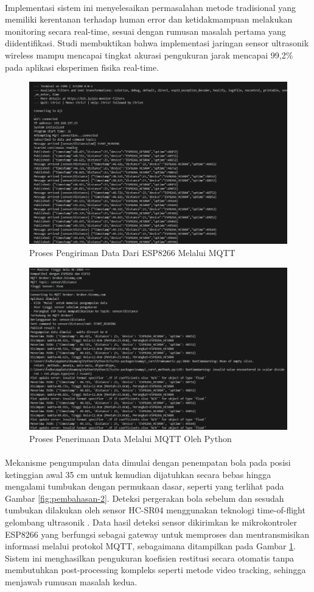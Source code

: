 \paragraph{}Implementasi sistem ini menyelesaikan permasalahan metode tradisional yang memiliki kerentanan terhadap human error dan ketidakmampuan melakukan monitoring secara real-time, sesuai dengan rumusan masalah pertama yang diidentifikasi. Studi \citep{wireless2019ultrasonic} membuktikan bahwa implementasi jaringan sensor ultrasonik wireless mampu mencapai tingkat akurasi pengukuran jarak mencapai 99,2\% pada aplikasi eksperimen fisika real-time.

\begin{figure}[!htbp]
\centering
    \includegraphics[width=0.6\linewidth]{images/ESP8266-SerialMonitor-MQTT.png}
    \caption{Proses Pengiriman Data Dari ESP8266 Melalui MQTT}
    \label{fig:pembahasan-3}
\end{figure}

\begin{figure}[!htbp]
\centering
    \includegraphics[width=0.6\linewidth]{images/Python-MQTT.png}
    \caption{Proses Penerimaan Data Melalui MQTT Oleh Python}
    \label{fig:pembahasan-4}
\end{figure}

\paragraph{}Mekanisme pengumpulan data dimulai dengan penempatan bola pada posisi ketinggian awal 35 cm untuk kemudian dijatuhkan secara bebas hingga mengalami tumbukan dengan permukaan dasar, seperti yang terlihat pada Gambar \ref{fig:pembahasan-2}. Deteksi pergerakan bola sebelum dan sesudah tumbukan dilakukan oleh sensor HC-SR04 menggunakan teknologi time-of-flight gelombang ultrasonik \citep{johnson2019time}. Data hasil deteksi sensor dikirimkan ke mikrokontroler ESP8266 yang berfungsi sebagai gateway untuk memproses dan mentransmisikan informasi melalui protokol MQTT, sebagaimana ditampilkan pada Gambar \ref{fig:pembahasan-3}. Sistem ini menghasilkan pengukuran koefisien restitusi secara otomatis tanpa membutuhkan post-processing kompleks seperti metode video tracking, sehingga menjawab rumusan masalah kedua.

